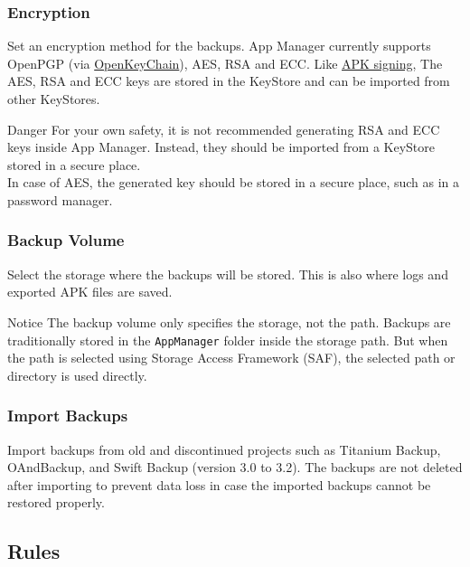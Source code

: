 \subsubsection{Encryption}\label{subsubsec:settings-encryption} %
Set an encryption method for the backups. App Manager currently supports OpenPGP (via
\href{https://f-droid.org/packages/org.sufficientlysecure.keychain/}{OpenKeyChain}), AES, RSA and ECC\@.
Like \hyperref[subsec:apk-signing]{APK signing}, The AES, RSA and ECC keys are stored in the
KeyStore and can be imported from other KeyStores.

\begin{danger}{Danger}
    For your own safety, it is not recommended generating RSA and ECC keys inside App Manager.
    Instead, they should be imported from a KeyStore stored in a secure place.\\
    In case of AES, the generated key should be stored in a secure place, such as in a password manager.
\end{danger}

\subsubsection{Backup Volume}\label{subsubsec:backup-volume} %
Select the storage where the backups will be stored. This is also where logs and exported APK files are saved.

\begin{tip}{Notice}
    The backup volume only specifies the storage, not the path. Backups are traditionally stored in the \texttt{AppManager} folder inside the storage path.
    But when the path is selected using Storage Access Framework (SAF), the selected path or directory is used directly.
\end{tip}

\subsubsection{Import Backups} %
Import backups from old and discontinued projects such as Titanium Backup, OAndBackup, and Swift Backup (version 3.0 to 3.2).
The backups are not deleted after importing to prevent data loss in case the imported backups cannot be restored properly.


\subsection{Rules}\label{subsec:rules} %

